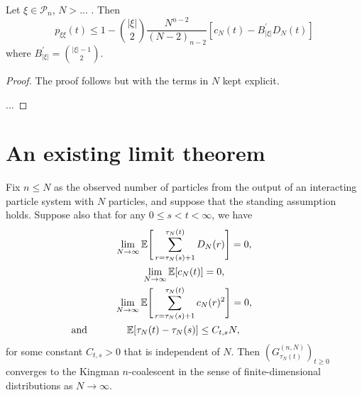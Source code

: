 \begin{prop}\label{thm:pDelta_UB}
Let $\xi \in \mathcal{P}_n$, $N>...$ . Then
\begin{equation*}
p_{\xi\xi}(t)
\leq 1 - \binom{|\xi|}{2} \frac{N^{n-2}}{(N-2)_{n-2}} 
        \left[ c_N(t) - B_{|\xi|}^\prime D_N(t) \right]
\end{equation*}
where $B_{|\xi|}^\prime = \binom{|\xi|-1}{2}$.
\end{prop}

\begin{proof}
The proof follows \textcite[Proof of Lemma 1 Case 1]{koskela2018} but with the terms in $N$ kept explicit. 


...
\end{proof}




\section{An existing limit theorem}

\begin{theorem}\label{thm:kjjs_mainthm}
Fix $n \leq N$ as the observed number of particles from the output of an interacting particle system with $N$ particles, and suppose that the standing assumption holds.
Suppose also that for any $0 \leq s < t < \infty$, we have
\begin{gather}\label{eq:kjjs_big_merger_bound}
\lim_{ N \rightarrow \infty } \E\Bigg[ \sum_{ r = \tau_N( s ) + 1 }^{ \tau_N( t ) } D_N( r ) \Bigg] = 0, \\
\label{eq:kjjs_binary_bound}
\lim_{ N \rightarrow \infty } \E[ c_N( t ) ] = 0, \\
\label{eq:kjjs_binary_bound_2}
\lim_{ N \rightarrow \infty } \E\Bigg[ \sum_{ r = \tau_N( s ) + 1 }^{ \tau_N( t ) } c_N( r )^2 \Bigg] = 0, \\
\label{eq:kjjs_tau_bound}
\text{and}\qquad\qquad\E[ \tau_N( t ) - \tau_N( s ) ] \leq C_{ t, s } N,\qquad\qquad\phantom{\text{and}}
\end{gather}
for some constant $C_{ t, s } > 0$ that is independent of $N$.
Then $( G_{ \tau_N( t ) }^{ ( n, N ) } )_{ t \geq 0 }$ converges to the Kingman $n$-coalescent in the sense of finite-dimensional distributions as $N \rightarrow \infty$. 
\end{theorem}




